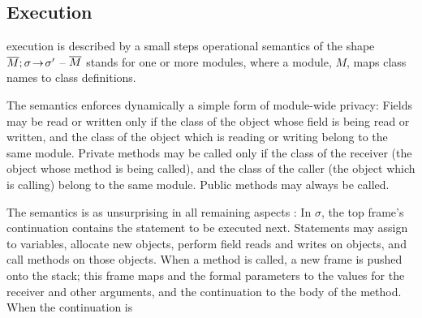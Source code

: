 {  

  
\subsection{\LangOO Execution}
\label{sect:execution}

 \LangOO execution is described by a small steps operational semantics of the shape $\overline{M};\sigma\! \rightarrow\! {\sigma'}$ 
 --  
  $\overline{M}$ stands for one or more modules, where a
  module,  $M$, maps class names to class definitions. 
   
{The semantics enforces dynamically a simple form of module-wide privacy: 
Fields may be read or written only if the class of the object whose field is being read or written, and the class of the object which is reading or writing belong to the same module.}
Private methods may be called only if the class of the receiver (the object whose method is being called), and the class of the caller (the object which is calling) belong to the same module.
Public methods may always be called.

The semantics is as unsurprising in all remaining aspects  :  
In $\sigma$, the  top frame's continuation contains the statement to be  executed next.  
 Statements may assign to variables, allocate new objects, 
perform field reads and writes on objects, and
 call methods on those objects. 
When a method is called, a new frame is pushed onto the stack; this frame  maps  and the formal parameters to  the values for the receiver and other arguments, and the continuation to the body of the method. 
 When the continuation is 


}
